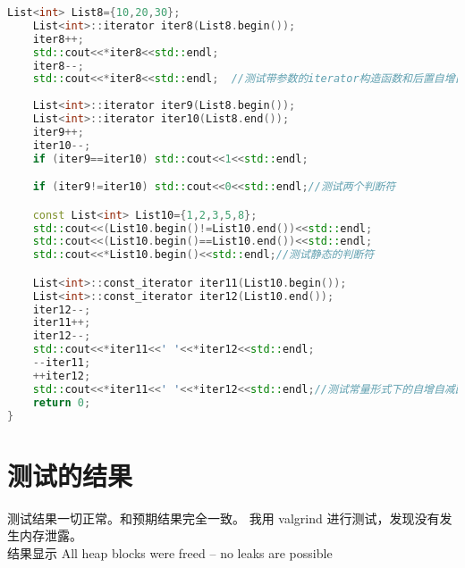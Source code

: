 \documentclass[UTF8]{ctexart}
\begin{document}
\begin{lstlisting}[language=C++, keywordstyle=\color{cyan},commentstyle=\color{green},stringstyle=\color{red},breaklines=true]
    List<int> List8={10,20,30};
    List<int>::iterator iter8(List8.begin());
    iter8++;
    std::cout<<*iter8<<std::endl;
    iter8--;
    std::cout<<*iter8<<std::endl;  //测试带参数的iterator构造函数和后置自增自减
    
    List<int>::iterator iter9(List8.begin());
    List<int>::iterator iter10(List8.end());
    iter9++;
    iter10--;
    if (iter9==iter10) std::cout<<1<<std::endl;

    if (iter9!=iter10) std::cout<<0<<std::endl;//测试两个判断符

    const List<int> List10={1,2,3,5,8};
    std::cout<<(List10.begin()!=List10.end())<<std::endl;
    std::cout<<(List10.begin()==List10.end())<<std::endl;
    std::cout<<*List10.begin()<<std::endl;//测试静态的判断符

    List<int>::const_iterator iter11(List10.begin());
    List<int>::const_iterator iter12(List10.end());
    iter12--;
    iter11++;
    iter12--;
    std::cout<<*iter11<<' '<<*iter12<<std::endl;
    --iter11;
    ++iter12;
    std::cout<<*iter11<<' '<<*iter12<<std::endl;//测试常量形式下的自增自减函数(包括前置后置)
    return 0;
}
\end{lstlisting}

\section{测试的结果}
测试结果一切正常。和预期结果完全一致。
我用 valgrind 进行测试，发现没有发生内存泄露。\\
结果显示 All heap blocks were freed -- no leaks are possible
\end{document}
